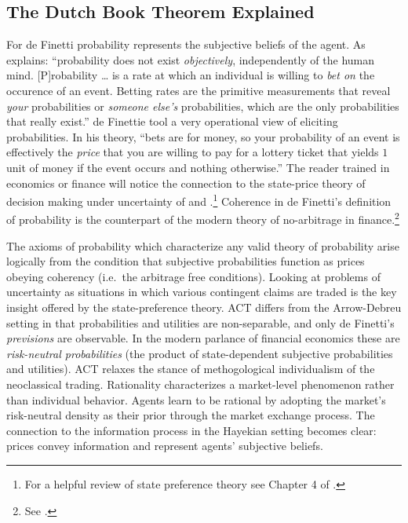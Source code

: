 \documentclass[11pt,]{article}
\begin{document}
\subsection{The Dutch Book Theorem
Explained}\label{the-dutch-book-theorem-explained}

For de Finetti probability represents the subjective beliefs of the
agent. As \citet{Nau2001} explains: ``probability does not exist
\emph{objectively}, independently of the human mind. {[}P{]}robability
\ldots{} is a rate at which an individual is willing to \emph{bet on}
the occurence of an event. Betting rates are the primitive measurements
that reveal \emph{your} probabilities or \emph{someone else's}
probabilities, which are the only probabilities that really exist.'' de
Finettie tool a very operational view of eliciting probabilities. In his
theory, ``bets are for money, so your probability of an event is
effectively the \emph{price} that you are willing to pay for a lottery
ticket that yields \(1\) unit of money if the event occurs and nothing
otherwise.'' The reader trained in economics or finance will notice the
connection to the state-price theory of decision making under
uncertainty of \citet{Arrow1964} and \citet{Debreu1959}.\footnote{For a
  helpful review of state preference theory see Chapter 4 of
  \citet{CopelandWestonShastri}.} Coherence in de Finetti's definition
of probability is the counterpart of the modern theory of no-arbitrage
in finance.\footnote{See \citet{PressaccoZiani2010}.}

The axioms of probability which characterize any valid theory of
probability arise logically from the condition that subjective
probabilities function as prices obeying coherency (i.e.~the arbitrage
free conditions). Looking at problems of uncertainty as situations in
which various contingent claims are traded is the key insight offered by
the state-preference theory. ACT differs from the Arrow-Debreu setting
in that probabilities and utilities are non-separable, and only de
Finetti's \emph{previsions} are observable. In the modern parlance of
financial economics these are \emph{risk-neutral probabilities} (the
product of state-dependent subjective probabilities and utilities). ACT
relaxes the stance of methogological individualism of the neoclassical
trading. Rationality characterizes a market-level phenomenon rather than
individual behavior. Agents learn to be rational by adopting the
market's risk-neutral density as their prior through the market exchange
process. The connection to the information process in the Hayekian
setting becomes clear: prices convey information and represent agents'
subjective beliefs.
\end{document}
